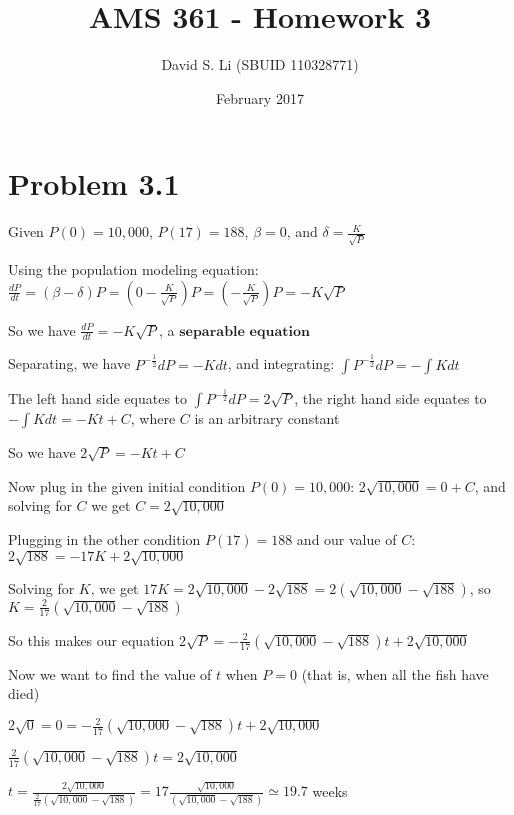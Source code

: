 \documentclass{article}
\title{AMS 361 - Homework 3}
\author{David S. Li (SBUID 110328771)}
\date{February 2017}
\begin{document}
\maketitle

\section{Problem 3.1}

\noindent Given $P(0) = 10,000$, $P(17) = 188$, $\beta = 0$, and $\delta = \frac{K}{\sqrt{P}}$ \par\vspace{0.25cm}

\noindent Using the population modeling equation: $\frac{dP}{dt} = (\beta - \delta)P = (0 - \frac{K}{\sqrt{P}})P = (-\frac{K}{\sqrt{P}})P = -K\sqrt{P}$ \par
\noindent So we have $\frac{dP}{dt} = -K\sqrt{P}$, a $\textbf{separable equation}$ \par\vspace{0.25cm}

\noindent Separating, we have $P^{-\frac{1}{2}}dP = -Kdt$, and integrating: $\int P^{-\frac{1}{2}}dP = -\int Kdt$ \par
\noindent The left hand side equates to $\int P^{-\frac{1}{2}}dP = 2\sqrt{P}$, the right hand side equates to $-\int Kdt = -Kt + C$, where $C$ is an arbitrary constant \par
\noindent So we have $2\sqrt{P} = -Kt + C$ \par\vspace{0.25cm}

\noindent Now plug in the given initial condition $P(0) = 10,000$: $2\sqrt{10,000} = 0 + C$, and solving for $C$ we get $C = 2\sqrt{10,000}$ \par
\noindent Plugging in the other condition $P(17) = 188$ and our value of $C$: $2\sqrt{188} = -17K + 2\sqrt{10,000}$ \par
\noindent Solving for $K$, we get $17K = 2\sqrt{10,000} - 2\sqrt{188} = 2(\sqrt{10,000} - \sqrt{188})$, so $K = \frac{2}{17}(\sqrt{10,000} - \sqrt{188})$ \par\vspace{0.25cm}

\noindent So this makes our equation $2\sqrt{P} = -\frac{2}{17}(\sqrt{10,000} - \sqrt{188})t + 2\sqrt{10,000}$ \par\vspace{0.25cm}

\noindent Now we want to find the value of $t$ when $P = 0$ (that is, when all the fish have died) \par
\noindent $2\sqrt{0} = 0 = -\frac{2}{17}(\sqrt{10,000} - \sqrt{188})t + 2\sqrt{10,000}$ \par
\noindent $\frac{2}{17}(\sqrt{10,000} - \sqrt{188})t = 2\sqrt{10,000}$ \par
\noindent $t = \frac{2\sqrt{10,000}}{\frac{2}{17}(\sqrt{10,000} - \sqrt{188})} = 17 \frac{\sqrt{10,000}}{(\sqrt{10,000} - \sqrt{188})} \simeq 19.7$ weeks \par\vspace{0.25cm}
\end{document}
